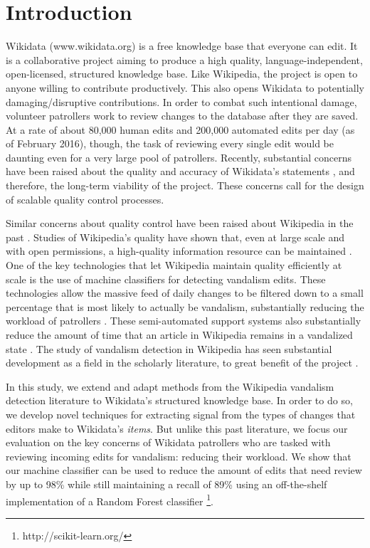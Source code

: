 \documentclass{sig-alternate-2013}
\begin{document}
\section{Introduction}
Wikidata (www.wikidata.org) is a free knowledge base that everyone can edit. It is a collaborative project aiming to produce a high quality, language-independent, open-licensed, structured knowledge base.  Like Wikipedia, the project is open to anyone willing to contribute productively.  This also opens Wikidata to potentially damaging/disruptive contributions. In order to combat such intentional damage, volunteer patrollers work to review changes to the database after they are saved. At a rate of about 80,000 human edits and 200,000 automated edits per day (as of February 2016), though, the task of reviewing every single edit would be daunting even for a very large pool of patrollers. Recently, substantial concerns have been raised about the quality and accuracy of Wikidata's statements \cite{kolbe:whither}, and therefore, the long-term viability of the project. These concerns call for the design of scalable quality control processes.

Similar concerns about quality control have been raised about Wikipedia in the past \cite{giles:internet}.  Studies of Wikipedia's quality have shown that, even at large scale and with open permissions, a high-quality information resource can be maintained \cite{giles:internet, stvilia:information}.  One of the key technologies that let Wikipedia maintain quality efficiently at scale is the use of machine classifiers for detecting vandalism edits. These technologies allow the massive feed of daily changes to be filtered down to a small percentage that is most likely to actually be vandalism, substantially reducing the workload of patrollers \cite{geiger:levee, geiger:work}.  These semi-automated support systems also substantially reduce the amount of time that an article in Wikipedia remains in a vandalized state \cite{geiger:levee}.  The study of vandalism detection in Wikipedia has seen substantial development as a field in the scholarly literature, to great benefit of the project \cite{wang:got, harpalani:language, adler:detecting, adler:wikipedia}.

In this study, we extend and adapt methods from the Wikipedia vandalism detection literature to Wikidata's structured knowledge base.  In order to do so, we develop novel techniques for extracting signal from the types of changes that editors make to Wikidata's \textit{items}. But unlike this past literature, we focus our evaluation on the key concerns of Wikidata patrollers who are tasked with reviewing incoming edits for vandalism: reducing their workload. We show that our machine classifier can be used to reduce the amount of edits that need review by up to 98\% while still maintaining a recall of 89\% using an off-the-shelf implementation of a Random Forest classifier \cite{breiman:random}\footnote{http://scikit-learn.org/}.
\end{document}
